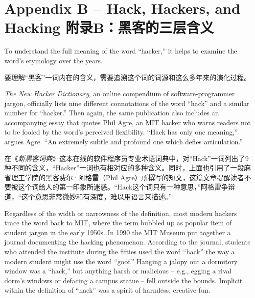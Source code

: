 

\chapter{\ifdefined\eng
Appendix B -- Hack, Hackers, and Hacking
\fi
\ifdefined\chs
附录B：黑客的三层含义
\fi} \label{Appendix B}

\ifdefined\eng
To understand the full meaning of the word ``hacker,'' it helps to examine the word's etymology over the years.
\fi

\ifdefined\chs
要理解``黑客''一词内在的含义，需要追溯这个词的词源和这么多年来的演化过程。
\fi

\ifdefined\eng
\textit{The New Hacker Dictionary}, an online compendium of software-programmer jargon, officially lists nine different connotations of the word ``hack'' and a similar number for ``hacker.'' Then again, the same publication also includes an accompanying essay that quotes Phil Agre, an MIT hacker who warns readers not to be fooled by the word's perceived flexibility. ``Hack has only one meaning,'' argues Agre. ``An extremely subtle and profound one which defies articulation.''  %
\fi

\ifdefined\chs
在《\textit{新黑客词典}》这本在线的软件程序员专业术语词典中，对``Hack''一词列出了9种不同的含义，``Hacker''一词也有相对应的多种含义。同时，上面也引用了一段麻省理工学院的黑客费尔·阿格雷（Phil Agre）所撰写的短文，这篇文章提醒读者不要被这个词给人的第一印象所迷惑。``Hack这个词只有一种意思，''阿格雷争辩道，``这个意思非常微妙和有深度，难以用语言来描述。'' %
\fi

\ifdefined\eng
Regardless of the width or narrowness of the definition, most modern hackers trace the word back to MIT, where the term bubbled up as popular item of student jargon in the early 1950s. In 1990 the MIT Museum put together a journal documenting the hacking phenomenon. According to the journal, students who attended the institute during the fifties used the word ``hack'' the way a modern student might use the word ``goof.'' Hanging a jalopy out a dormitory window was a ``hack,'' but anything harsh or malicious -- e.g., egging a rival dorm's windows or defacing a campus statue -- fell outside the bounds. Implicit within the definition of ``hack'' was a spirit of harmless, creative fun.
\fi

